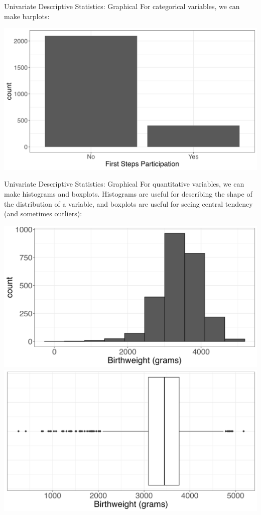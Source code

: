 \documentclass[
  ignorenonframetext,
]{beamer}
\begin{document}
\begin{frame}{Univariate Descriptive Statistics: Graphical}
\protect\hypertarget{univariate-descriptive-statistics-graphical}{}
For categorical variables, we can make barplots:

\includegraphics{fs_bar.png}
\end{frame}

\begin{frame}{Univariate Descriptive Statistics: Graphical}
\protect\hypertarget{univariate-descriptive-statistics-graphical-1}{}
For quantitative variables, we can make histograms and boxplots.
Histograms are useful for describing the shape of the distribution of a
variable, and boxplots are useful for seeing central tendency (and
sometimes outliers):

\includegraphics{fs_hist.png} \includegraphics{fs_box.png}
\end{frame}
\end{document}
